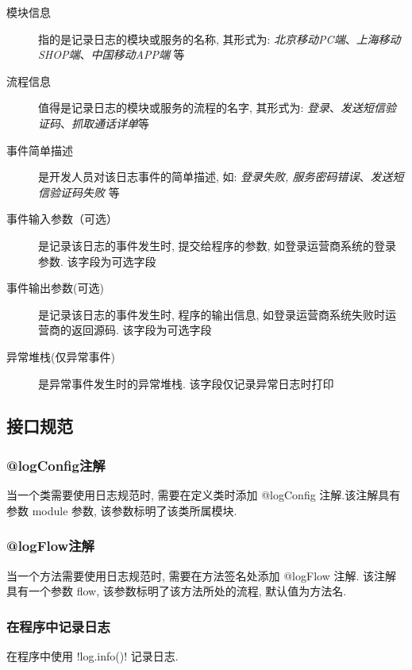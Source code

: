 \documentclass[UTF8,fntef]{ctexart}
\begin{document}
	\begin{description}
	\item[模块信息] 指的是记录日志的模块或服务的名称, 其形式为: \textit{北京移动PC端}、\textit{上海移动SHOP端}、\textit{中国移动APP端} 等
	
	\item[流程信息] 值得是记录日志的模块或服务的流程的名字, 其形式为: \textit{登录}、\textit{发送短信验证码}、\textit{抓取通话详单}等
	
	\item[事件简单描述] 是开发人员对该日志事件的简单描述, 如: \textit{登录失败, 服务密码错误}、\textit{发送短信验证码失败} 等
	
	\item[事件输入参数（可选）] 是记录该日志的事件发生时, 提交给程序的参数, 如登录运营商系统的登录参数. 该字段为可选字段
	
	\item[事件输出参数(可选)] 是记录该日志的事件发生时, 程序的输出信息, 如登录运营商系统失败时运营商的返回源码. 该字段为可选字段
	
	\item[异常堆栈(仅异常事件)] 是异常事件发生时的异常堆栈. 该字段仅记录异常日志时打印
	\end{description}
			
	\subsection{接口规范}
	\subsubsection{@logConfig注解}
	当一个类需要使用日志规范时, 需要在定义类时添加 @logConfig 注解.该注解具有参数 module 参数, 该参数标明了该类所属模块.
	
	\subsubsection{@logFlow注解}
	当一个方法需要使用日志规范时, 需要在方法签名处添加 @logFlow 注解. 该注解具有一个参数 flow, 该参数标明了该方法所处的流程, 默认值为方法名.
	
	\subsubsection{在程序中记录日志}
	在程序中使用 \spverb!log.info()! 记录日志.
	
	\begin{spverbatim}
	
	\end{spverbatim}	
	
\end{document}
